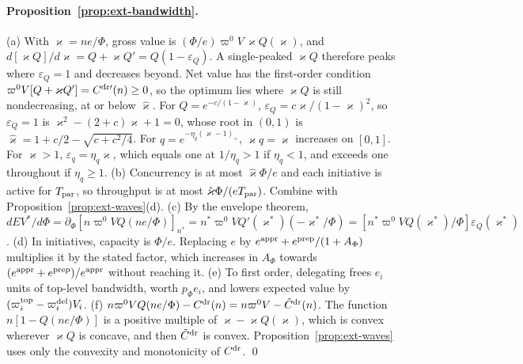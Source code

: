 \paragraph{Proposition~\ref{prop:ext-bandwidth}.} (a) With $\varkappa=ne/\Phi$, gross value is $(\Phi/e)\varpi^0V\,\varkappa Q(\varkappa)$, and $d[\varkappa Q]/d\varkappa=Q+\varkappa Q'=Q(1-\varepsilon_Q)$. A single-peaked $\varkappa Q$ therefore peaks where $\varepsilon_Q=1$ and decreases beyond. Net value has the first-order condition $\varpi^0V[Q+\varkappa Q']=C^{\rm dr\prime}(n)\ge0$, so the optimum lies where $\varkappa Q$ is still nondecreasing, at or below $\hat \varkappa$. For $Q=e^{-c/(1-\varkappa)}$, $\varepsilon_Q=c\varkappa/(1-\varkappa)^2$, so $\varepsilon_Q=1$ is $\varkappa^2-(2+c)\varkappa+1=0$, whose root in $(0,1)$ is $\hat \varkappa=1+c/2-\sqrt{c+c^2/4}$. For $q=e^{-\eta_q(\varkappa-1)_+}$, $\varkappa q=\varkappa$ increases on $[0,1]$. For $\varkappa>1$, $\varepsilon_q=\eta_q\varkappa$, which equals one at $1/\eta_q>1$ if $\eta_q<1$, and exceeds one throughout if $\eta_q\ge1$.
(b) Concurrency is at most $\hat \varkappa\Phi/e$ and each initiative is active for $T_{\rm par}$, so throughput is at most $\hat \varkappa\Phi/(eT_{\rm par})$. Combine with Proposition~\ref{prop:ext-waves}(d).
(c) By the envelope theorem, $dEV^*/d\Phi=\partial_\Phi[n\varpi^0VQ(ne/\Phi)]_{n^*}=n^*\varpi^0VQ'(\varkappa^*)(-\varkappa^*/\Phi)=[n^*\varpi^0VQ(\varkappa^*)/\Phi]\varepsilon_Q(\varkappa^*)$.
(d) In initiatives, capacity is $\Phi/e$. Replacing $e$ by $e^{\rm appr}+e^{\rm prep}/(1+A_\Phi)$ multiplies it by the stated factor, which increases in $A_\Phi$ towards $(e^{\rm appr}+e^{\rm prep})/e^{\rm appr}$ without reaching it.
(e) To first order, delegating frees $e_i$ units of top-level bandwidth, worth $p_\Phi e_i$, and lowers expected value by $(\varpi^{\rm top}_i-\varpi^{\rm del}_i)V_i$.
(f) $n\varpi^0VQ(ne/\Phi)-C^{\rm dr}(n)=n\varpi^0V-\tilde C^{\rm dr}(n)$. The function $n[1-Q(ne/\Phi)]$ is a positive multiple of $\varkappa-\varkappa Q(\varkappa)$, which is convex wherever $\varkappa Q$ is concave, and then $\tilde C^{\rm dr}$ is convex. Proposition~\ref{prop:ext-waves} uses only the convexity and monotonicity of $C^{\rm dr}$. \qed

